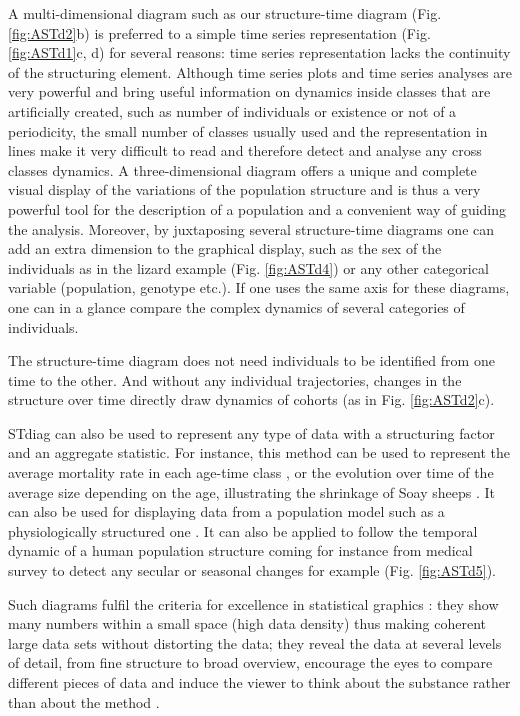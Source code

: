 A multi-dimensional diagram such as our structure-time diagram (Fig.
\ref{fig:ASTd2}b) is preferred to a simple time series representation (Fig.
\ref{fig:ASTd1}c, d) for several reasons: time series representation lacks the continuity of the structuring
element. Although time series plots and time series analyses are very powerful
and bring useful information on dynamics inside classes that are artificially
created, such as number of individuals or existence or not of a periodicity, the
small number of classes usually used and the representation in lines make it
very difficult to read and therefore detect and analyse any cross classes
dynamics. A three-dimensional diagram offers a unique and complete visual
display of the variations of the population structure and is thus a very
powerful tool for the description of a population and a convenient way of
guiding the analysis. Moreover, by juxtaposing several structure-time diagrams
one can add an extra dimension to the graphical display, such as the sex of the
individuals as in the lizard example (Fig. \ref{fig:ASTd4}) or any other
categorical variable (population, genotype etc.). If one uses the same axis for these diagrams, one
can in a glance compare the complex dynamics of several categories of
individuals.

The structure-time diagram does not need individuals to be identified from one
time to the other. And without any individual trajectories, changes in the
structure over time directly draw dynamics of cohorts (as in Fig.
\ref{fig:ASTd2}c).

STdiag can also be used to represent any type of data with a structuring factor
and an aggregate statistic. For instance, this method can be used to represent
the average mortality rate in each age-time class \autocites{vaupel1987a}, or
the evolution over time of the average size depending on the age, illustrating
the shrinkage of Soay sheeps \autocites{ozgul2009a}. It can also be used for
displaying data from a population model such as a physiologically structured one
\autocites{metz1986a}. It can also be applied to follow the temporal dynamic of
a human population structure coming for instance from medical survey to detect
any secular or seasonal changes for example (Fig. \ref{fig:ASTd5}).

Such diagrams fulfil the criteria for excellence in statistical graphics
\autocites{tufte1990a}: they show many numbers within a small space (high
data density) thus making coherent large data sets without distorting the data; they reveal the
data at several levels of detail, from fine structure to broad overview,
encourage the eyes to compare different pieces of data and induce the viewer to
think about the substance rather than about the method \autocites{tufte2001a}.

